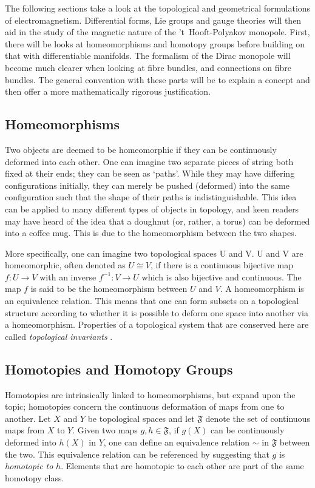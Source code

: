 \documentclass[fleqn, twocolumn, 10pt]{article}
\begin{document}
The following sections take a look at the topological and geometrical formulations of electromagnetism. Differential forms, Lie groups and gauge theories will then aid in the study of the magnetic nature of the 't~Hooft-Polyakov monopole. First, there will be looks at homeomorphisms and homotopy groups before building on that with differentiable manifolds. The formalism of the Dirac monopole will become much clearer when looking at fibre bundles, and connections on fibre bundles. The general convention with these parts will be to explain a concept and then offer a more mathematically rigorous justification. 


\subsection{Homeomorphisms}
Two objects are deemed to be homeomorphic if they can be continuously deformed into each other. One can imagine two separate pieces of string both fixed at their ends; they can be seen as ‘paths’. While they may have differing configurations initially, they can merely be pushed (deformed) into the same configuration such that the shape of their paths is indistinguishable. This idea can be applied to many different types of objects in topology, and keen readers may have heard of the idea that a doughnut (or, rather, a torus) can be deformed into a coffee mug. This is due to the homeomorphism between the two shapes. 

More specifically, one can imagine two topological spaces U and V. U and V are homeomorphic, often denoted as $U\cong V$, if there is a continuous bijective map $f: U\to V$ with an inverse $f^{-1}: V\to U$ which is also bijective and continuous. The map $f$ is said to be the homeomorphism between $U$ and $V$. A homeomorphism is an equivalence relation. This means that one can form subsets on a topological structure according to whether it is possible to deform one space into another via a homeomorphism. Properties of a topological system that are conserved here are called \textit{topological invariants} \cite{nakahara2003geometry, sharp2019topology, zirnbauer2013topology, korner2015metric, kobayashi1963foundations}.


\subsection{Homotopies and Homotopy Groups}
Homotopies are intrinsically linked to homeomorphisms, but expand upon the topic; homotopies concern the continuous deformation of maps from one to another. Let $X$ and $Y$ be topological spaces and let $\mathfrak{F}$ denote the set of continuous maps from $X$ to $Y$. Given two maps $g,h \in \mathfrak{F}$, if $g(X)$ can be continuously deformed into $h(X)$ in $Y$, one can define an equivalence relation $\sim$ in $\mathfrak{F}$ between the two. This equivalence relation can be referenced by suggesting that $g$ is \textit{homotopic to} $h$. Elements that are homotopic to each other are part of the same homotopy class.
\end{document}
